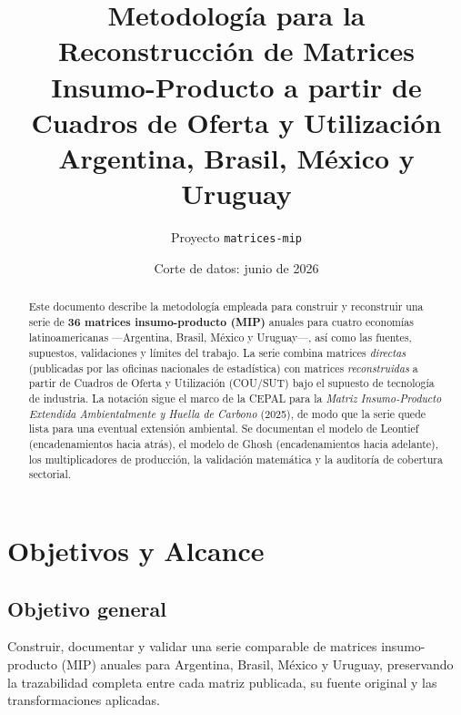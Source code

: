 \documentclass[11pt,a4paper]{article}
\title{\textbf{Metodología para la Reconstrucción de Matrices\\
Insumo-Producto a partir de Cuadros de Oferta y Utilización}\\[4pt]
\large Argentina, Brasil, México y Uruguay}
\author{Proyecto \texttt{matrices-mip}}
\date{Corte de datos: junio de 2026}
\begin{document}
\maketitle
\thispagestyle{fancy}

\begin{abstract}
\noindent
Este documento describe la metodología empleada para construir y reconstruir
una serie de \textbf{36 matrices insumo-producto (MIP)} anuales para cuatro
economías latinoamericanas —Argentina, Brasil, México y Uruguay—, así como las
fuentes, supuestos, validaciones y límites del trabajo. La serie combina
matrices \emph{directas} (publicadas por las oficinas nacionales de estadística)
con matrices \emph{reconstruidas} a partir de Cuadros de Oferta y Utilización
(COU/SUT) bajo el supuesto de tecnología de industria. La notación sigue el
marco de la CEPAL para la \emph{Matriz Insumo-Producto Extendida Ambientalmente
y Huella de Carbono} (2025), de modo que la serie quede lista para una eventual
extensión ambiental. Se documentan el modelo de Leontief (encadenamientos hacia
atrás), el modelo de Ghosh (encadenamientos hacia adelante), los multiplicadores
de producción, la validación matemática y la auditoría de cobertura sectorial.
\end{abstract}

\tableofcontents
\newpage

\section{Objetivos y Alcance}

\subsection{Objetivo general}
Construir, documentar y validar una serie comparable de matrices insumo-producto
(MIP) anuales para Argentina, Brasil, México y Uruguay, preservando la
trazabilidad completa entre cada matriz publicada, su fuente original y las
transformaciones aplicadas.
\end{document}
